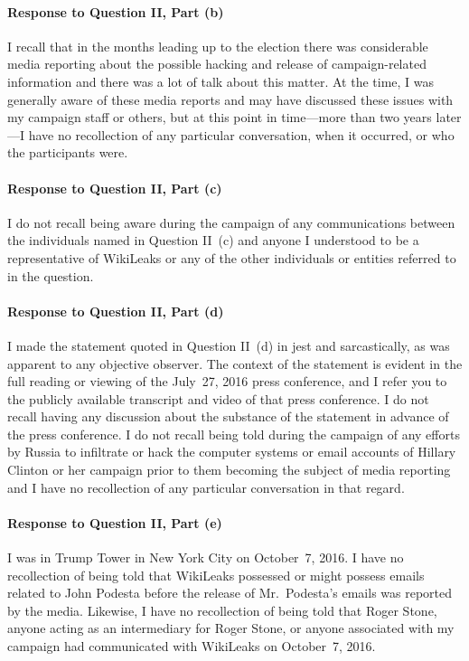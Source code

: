 \paragraph*{Response to Question II, Part (b)}

I recall that in the months leading up to the election there was considerable media reporting about the possible hacking and release of campaign-related information and there was a lot of talk about this matter.
At the time, I was generally aware of these media reports and may have discussed these issues with my campaign staff or others, but at this point in time---more than two years later---I have no recollection of any particular conversation, when it occurred, or who the participants were.

\paragraph*{Response to Question II, Part (c)}

I do not recall being aware during the campaign of any communications between the individuals named in Question II~(c) and anyone I understood to be a representative of WikiLeaks or any of the other individuals or entities referred to in the question.

\paragraph*{Response to Question II, Part (d)}

I made the statement quoted in Question II~(d) in jest and sarcastically, as was apparent to any objective observer.
The context of the statement is evident in the full reading or viewing of the July~27, 2016 press conference, and I refer you to the publicly available transcript and video of that press conference.
I do not recall having any discussion about the substance of the statement in advance of the press conference.
I do not recall being told during the campaign of any efforts by Russia to infiltrate or hack the computer systems or email accounts of Hillary Clinton or her campaign prior to them becoming the subject of media reporting and I have no recollection of any particular conversation in that regard.

\paragraph*{Response to Question II, Part (e)}

I was in Trump Tower in New York City on October~7, 2016.
I have no recollection of being told that WikiLeaks possessed or might possess emails related to John Podesta before the release of Mr.~Podesta's emails was reported by the media.
Likewise, I have no recollection of being told that Roger Stone, anyone acting as an intermediary for Roger Stone, or anyone associated with my campaign had communicated with WikiLeaks on October~7, 2016.

